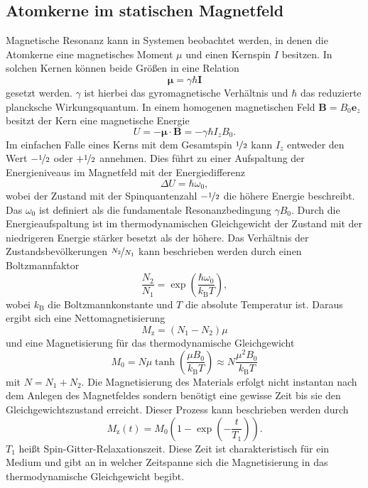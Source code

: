 \documentclass[numbers=noenddot,a4paper,notitlepage,twoside,BCOR15mm]{scrartcl}
\begin{document}
	\subsection{Atomkerne im statischen Magnetfeld}
	Magnetische Resonanz kann in Systemen beobachtet werden, in denen die Atomkerne eine magnetisches Moment $\mu$ und einen Kernspin $I$ besitzen. In solchen Kernen können beide Größen in eine Relation 
	\begin{equation}
		\mathbf{\mu} = \gamma \hbar \mathbf{I}
	\end{equation}
	gesetzt werden. $\gamma$ ist hierbei das gyromagnetische Verhältnis und $\hbar$ das reduzierte plancksche Wirkungsquantum. In einem homogenen magnetischen Feld $\mathbf{B} = B_0 \mathbf{e}_z$ besitzt der Kern eine magnetische Energie
	\begin{equation}
		U = -\mathbf{\mu} \cdot \mathbf{B} = -\gamma \hbar I_z B_0.
	\end{equation}
	Im einfachen Falle eines Kerns mit dem Gesamtspin $\nicefrac{1}{2}$ kann $I_z$ entweder den Wert $-\nicefrac{1}{2}$ oder $+\nicefrac{1}{2}$ annehmen. Dies führt zu einer Aufspaltung der Energieniveaus im Magnetfeld mit der Energiedifferenz
	\begin{equation}
	\label{eq:DeltaU}
		\Delta U = \hbar \omega_0,
	\end{equation}
	wobei der Zustand mit der Spinquantenzahl $-\nicefrac{1}{2}$ die höhere Energie beschreibt. Das $\omega_0$ ist definiert als die fundamentale Resonanzbedingung $\gamma B_0$. Durch die Energieaufspaltung ist im thermodynamischen Gleichgewicht der Zustand mit der niedrigeren Energie stärker besetzt als der höhere. Das Verhältnis der Zustandsbevölkerungen $\nicefrac{N_2}{N_1}$ kann beschrieben werden durch einen Boltzmannfaktor
	\begin{equation}
		\frac{N_2}{N_1} = \exp\left(\frac{\hbar \omega_0}{k_\mathrm{B}T}\right),
	\end{equation}
	wobei $k_\mathrm{B}$ die Boltzmannkonstante und $T$ die absolute Temperatur ist. Daraus ergibt sich eine Nettomagnetisierung
	\begin{equation}
		M_\mathrm{z} = (N_1 -N_2)\mu
	\end{equation}
	und eine Magnetisierung für das thermodynamische Gleichgewicht
	\begin{equation}
		M_0 = N \mu \tanh \left(\frac{\mu B_0}{k_\mathrm{B}T}\right) \approx N \frac{\mu^2 B_0}{k_\mathrm{B}T}
	\end{equation}
	mit $N = N_1 + N_2$.
	Die Magnetisierung des Materials erfolgt nicht instantan nach dem Anlegen des Magnetfeldes sondern benötigt eine gewisse Zeit bis sie den Gleichgewichtszustand erreicht. Dieser Prozess kann beschrieben werden durch
	\begin{equation}
	\label{eq:T1}
		M_\mathrm{z}(t) = M_0\left(1-\exp\left(-\frac{t}{T_1}\right)\right).
	\end{equation}
	$T_1$ heißt Spin-Gitter-Relaxationszeit. Diese Zeit ist charakteristisch für ein Medium und gibt an in welcher Zeitspanne sich die Magnetisierung in das thermodynamische Gleichgewicht begibt.
	
\end{document}
